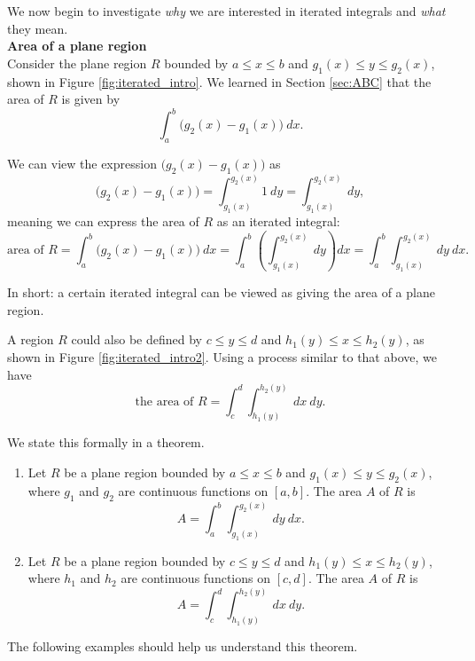 We now begin to investigate \textit{why} we are interested in iterated integrals and \textit{what} they mean.\\

\noindent\textbf{\large Area of a plane region}\\

Consider the plane region $R$ bounded by $a\leq x\leq b$ and $g_1(x)\leq y\leq g_2(x)$, shown in Figure \ref{fig:iterated_intro}. We learned in Section \ref{sec:ABC} that the area of $R$ is given by 
$$\int_a^b \big(g_2(x)-g_1(x)\big)\ dx.$$

We can  view the expression $\big(g_2(x)-g_1(x)\big)$ as 
$$\big(g_2(x)-g_1(x)\big) = \int_{g_1(x)}^{g_2(x)} 1\ dy =\int_{g_1(x)}^{g_2(x)} \ dy,$$
meaning we can express the area of $R$ as an iterated integral:
$$\text{area of }R = \int_a^b \big(g_2(x)-g_1(x)\big)\ dx = \int_a^b\left(\int_{g_1(x)}^{g_2(x)} \ dy\right) dx =\int_a^b\int_{g_1(x)}^{g_2(x)} \ dy\ dx.$$

In short: a certain iterated integral can be viewed as giving the area of a plane region.

A region $R$ could also be defined by $c\leq y\leq d$ and $h_1(y)\leq x\leq h_2(y)$, as shown in Figure \ref{fig:iterated_intro2}. Using a process similar to that above, we have 
$$\text{the area of }R = \int_c^d\int_{h_1(y)}^{h_2(y)} \ dx\ dy.$$


We state this formally in a theorem.

{\begin{enumerate}
	\item Let $R$ be a plane region bounded by $a\leq x\leq b$ and $g_1(x)\leq y\leq g_2(x)$, where $g_1$ and $g_2$ are continuous functions on $[a,b]$. The area $A$ of $R$ is
	$$A = \int_a^b\int_{g_1(x)}^{g_2(x)} \ dy\ dx.$$
	\item Let $R$ be a plane region bounded by $c\leq y\leq d$ and $h_1(y)\leq x\leq h_2(y)$, where $h_1$ and $h_2$ are continuous functions on $[c,d]$. The area $A$ of $R$ is
	$$A = \int_c^d\int_{h_1(y)}^{h_2(y)} \ dx\ dy.$$
\end{enumerate}
}

The following examples should help us understand this theorem.\\


